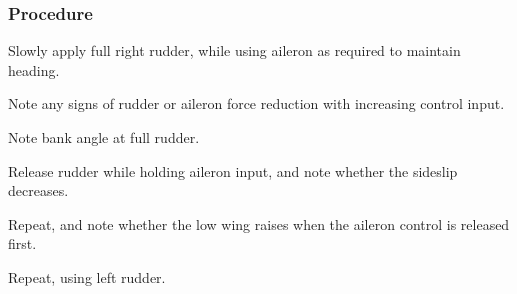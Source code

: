 % 
% 
%
 \subsubsection*{Procedure}
 \begin{compactenum}
    \item Slowly apply full right rudder, while using aileron as required to maintain heading.
    \item Note any signs of rudder or aileron force reduction with increasing control input.
    \item Note bank angle at full rudder.
    \item Release rudder while holding aileron input, and note whether the sideslip decreases.
    \item Repeat, and note whether the low wing raises when the aileron control is released first.
    \item Repeat, using left rudder.
    \end{compactenum}
